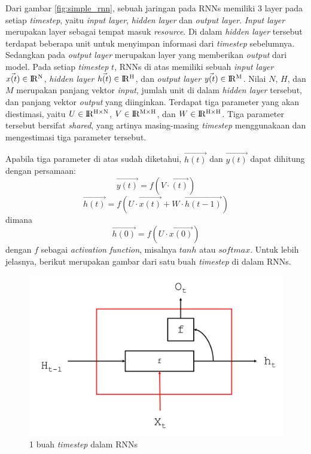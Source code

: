 Dari gambar \ref{fig:simple_rnn}, sebuah jaringan pada RNNs memiliki 3 layer pada setiap \textit{timestep}, yaitu \textit{input layer}, \textit{hidden layer} dan \textit{output layer}. \textit{Input layer} merupakan layer sebagai tempat masuk \textit{resource}. Di dalam \textit{hidden layer} tersebut terdapat beberapa unit untuk menyimpan informasi dari \textit{timestep} sebelumnya. Sedangkan pada \textit{output layer} merupakan layer yang memberikan \textit{output} dari model. Pada setiap \textit{timestep} $ t $, RNNs di atas memiliki sebuah \textit{input layer} $ \vec{x(t)} \in {\rm I\!R^{N}} $, \textit{hidden layer} $ \vec{h(t)} \in {\rm I\!R^{H}} $, dan \textit{output layer} $ \vec{y(t)} \in {\rm I\!R^{M}} $. Nilai $ N $, $ H $, dan $ M $ merupakan panjang vektor \textit{input}, jumlah unit di dalam \textit{hidden layer} tersebut, dan panjang vektor \textit{output} yang diinginkan. Terdapat tiga parameter yang akan diestimasi, yaitu $ U \in {\rm I\!R^{H \times N }} $, $ V \in {\rm I\!R^{M \times H}}$, dan $ W \in {\rm I\!R^{H \times H}}$. Tiga parameter tersebut bersifat \textit{shared}, yang artinya masing-masing \textit{timestep} menggunakaan dan mengestimasi tiga parameter tersebut.

Apabila tiga parameter di atas sudah diketahui, $ \vec{h(t)} $ dan $ \vec{y(t)} $ dapat dihitung dengan persamaan:
\begin{equation}
\vec{y(t)} = f(V \cdot \vec{(t)})
\end{equation}
\begin{equation}
\vec{h(t)} = f(U \cdot \vec{x(t)} + W \cdot \vec{h(t-1)})
\end{equation}
dimana
\begin{equation}
\vec{h(0)} = f(U \cdot \vec{x(0)})
\end{equation}
dengan $ f $ sebagai \textit{activation function}, misalnya $ tanh $ atau $ softmax $. Untuk lebih jelasnya, berikut merupakan gambar dari satu buah \textit{timestep} di dalam RNNs.
\begin{figure}
	\centering
	\includegraphics[width=0.80\linewidth]{images/nodes_rnn}
	\caption{1 buah \textit{timestep} dalam RNNs}
	\label{fig:nodes_rnn}
\end{figure}

